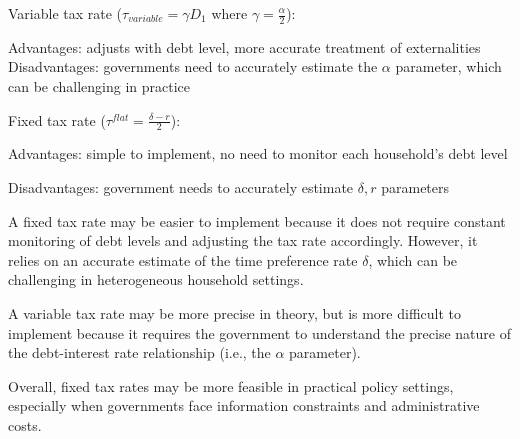 \documentclass[a4paper,12pt]{article} %
\theoremstyle{nonitalic}
\begin{document}
Variable tax rate ($\tau_{variable} = \gamma D_1$ where $\gamma = \frac{\alpha}{2}$):

Advantages: adjusts with debt level, more accurate treatment of externalities 
Disadvantages: governments need to accurately estimate the $\alpha$ parameter, which can be challenging in practice

Fixed tax rate ($\tau^{flat} = \frac{\delta - r}{2}$):

Advantages: simple to implement, no need to monitor each household's debt level 

Disadvantages: government needs to accurately estimate $\delta, r$ parameters

A fixed tax rate may be easier to implement because 
it does not require constant monitoring of debt levels 
and adjusting the tax rate accordingly. 
However, it relies on an accurate estimate of the time preference rate $\delta$, 
which can be challenging in heterogeneous household settings.

A variable tax rate may be more precise in theory, 
but is more difficult to implement because it requires the government to understand 
the precise nature of the debt-interest rate relationship (i.e., the $\alpha$ parameter).

Overall, fixed tax rates may be more feasible in practical policy settings, 
especially when governments face information constraints and administrative costs.
\end{document}

